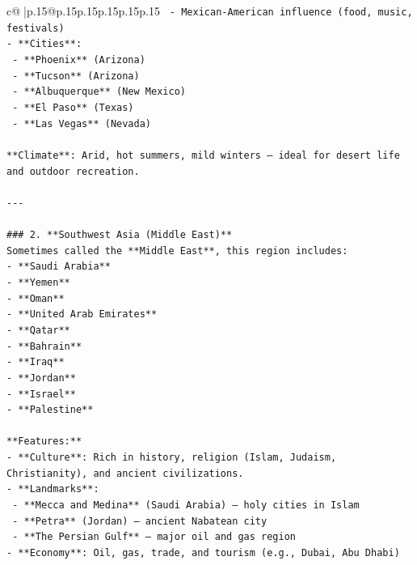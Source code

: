 \documentclass{article}
\begin{document}
{\begin{supertabular}{c@{$\;$}|p{.15\linewidth}@{}p{.15\linewidth}p{.15\linewidth}p{.15\linewidth}p{.15\linewidth}p{.15\linewidth}}
{{{\texttt{  {-} Mexican{-}American influence (food, music, festivals)} \\
\texttt{{-} **Cities**:} \\
\texttt{  {-} **Phoenix** (Arizona)} \\
\texttt{  {-} **Tucson** (Arizona)} \\
\texttt{  {-} **Albuquerque** (New Mexico)} \\
\texttt{  {-} **El Paso** (Texas)} \\
\texttt{  {-} **Las Vegas** (Nevada)} \\
\\ 
\texttt{**Climate**: Arid, hot summers, mild winters — ideal for desert life and outdoor recreation.} \\
\\ 
\texttt{{-}{-}{-}} \\
\\ 
\texttt{\#\#\# 2. **Southwest Asia (Middle East)**} \\
\texttt{Sometimes called the **Middle East**, this region includes:} \\
\texttt{{-} **Saudi Arabia**} \\
\texttt{{-} **Yemen**} \\
\texttt{{-} **Oman**} \\
\texttt{{-} **United Arab Emirates**} \\
\texttt{{-} **Qatar**} \\
\texttt{{-} **Bahrain**} \\
\texttt{{-} **Iraq**} \\
\texttt{{-} **Jordan**} \\
\texttt{{-} **Israel**} \\
\texttt{{-} **Palestine**} \\
\\ 
\texttt{**Features:**} \\
\texttt{{-} **Culture**: Rich in history, religion (Islam, Judaism, Christianity), and ancient civilizations.} \\
\texttt{{-} **Landmarks**:} \\
\texttt{  {-} **Mecca and Medina** (Saudi Arabia) – holy cities in Islam} \\
\texttt{  {-} **Petra** (Jordan) – ancient Nabatean city} \\
\texttt{  {-} **The Persian Gulf** – major oil and gas region} \\
\texttt{{-} **Economy**: Oil, gas, trade, and tourism (e.g., Dubai, Abu Dhabi)} \\
}}}
\end{supertabular}}
\end{document}
